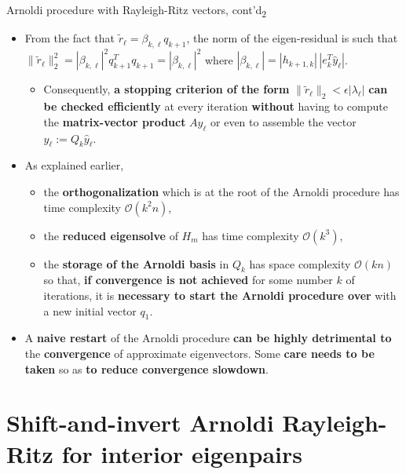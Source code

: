 \documentclass[t,usepdftitle=false]{beamer}
\begin{document}
\begin{frame}{Arnoldi procedure with Rayleigh-Ritz vectors, cont'd\textsubscript{2}}
\begin{itemize}
\item  From the fact that $\tilde{r}_\ell=\beta_{k,\ell}q_{k+1}$, the norm of the eigen-residual is such that $\|\tilde{r}_\ell\|_2^2=|\beta_{k,\ell}|^2q_{k+1}^Tq_{k+1}=|\beta_{k,\ell}|^2$ where $|\beta_{k,\ell}|=|h_{k+1,k}|\,|e_k^T\hat{y}_\ell|$.
\begin{itemize}\normalsize
\item Consequently, \textbf{a stopping criterion of the form} $\|\tilde{r}_\ell\|_2<\epsilon|\lambda_\ell|$ \textbf{can be checked efficiently} at every iteration \textbf{without} having to compute the \textbf{matrix-vector product} $Ay_\ell$ or even to assemble the vector $y_\ell:=Q_k\hat{y}_\ell$.
\end{itemize}
\item As explained earlier,
\begin{itemize}\normalsize
\item the \textbf{orthogonalization} which is at the root of the Arnoldi procedure has time complexity $\mathcal{O}(k^2n)$,
\item the \textbf{reduced eigensolve} of $H_m$ has time complexity $\mathcal{O}(k^3)$,
\item the \textbf{storage of the Arnoldi basis} in  $Q_k$ has space complexity $\mathcal{O}(kn)$ so that, \textbf{if convergence is not achieved} for some number $k$ of iterations, it is \textbf{necessary to start the Arnoldi procedure over} with a new initial vector $q_1$.
\end{itemize}
\item A \textbf{naive restart} of the Arnoldi procedure \textbf{can be highly detrimental to} the \textbf{convergence} of approximate eigenvectors. Some \textbf{care needs to be taken} so as \textbf{to reduce convergence slowdown}.
\end{itemize}
\end{frame}

\section{Shift-and-invert Arnoldi Rayleigh-Ritz for interior eigenpairs}
\end{document}
